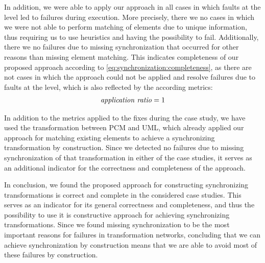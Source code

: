 In addition, we were able to apply our approach in all cases in which faults at the \leveltransformation level led to failures during execution.
More precisely, there we no cases in which we were not able to perform matching of elements due to unique information, thus requiring us to use heuristics and having the possibility to fail.
Additionally, there we no failures due to missing synchronization that occurred for other reasons than missing element matching.
This indicates completeness of our proposed approach according to \autoref{eq:synchronization:completeness}, as there are not cases in which the approach could not be applied and resolve failures due to faults at the \leveltransformation level, which is also reflected by the according metrics:
\begin{align*}
    \mathit{application\ ratio} = 1
\end{align*}

In addition to the metrics applied to the fixes during the case study, we have used the transformation between \gls{PCM} and \gls{UML}, which already applied our approach for matching existing elements to achieve a synchronizing transformation by construction.
Since we detected no failures due to missing synchronization of that transformation in either of the case studies, it serves as an additional indicator for the correctness and completeness of the approach.

In conclusion, we found the proposed approach for constructing synchronizing transformations is correct and complete in the considered case studies.
This serves as an indicator for its general correctness and completeness, and thus the possibility to use it is  constructive approach for achieving synchronizing transformations.
Since we found missing synchronization to be the most important reasons for failures in transformation networks, concluding that we can achieve synchronization by construction means that we are able to avoid most of these failures by construction.


